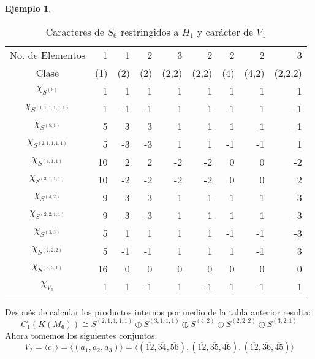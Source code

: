 \documentclass[12pt]{book}
\theoremstyle{definition}
\newtheorem{example}[theorem]{Ejemplo}
\newcounter{in}
\begin{document}
\begin{example}
  \begin{table}[!hbtp]
    \centering
    \begin{tabular}{c |r r r r r r r r}
      No. de Elementos  & 1 & 1 & 2 & 3 & 2 & 2 & 2 & 3  \\
      Clase&(1)& (2) & (2) & (2,2) & (2,2)& (4) & (4,2) & (2,2,2)\\
      \hline
      $\chi_{S^{{(6)}}}$         & 1 & 1 &1  & 1 & 1 & 1 & 1 & 1\\
      $\chi_{S^{{(1,1,1,1,1,1)}}}$ & 1 & -1&-1 & 1 & 1 &-1 & 1 &-1\\
      $\chi_{S^{{(5,1)}}}$       & 5 & 3 & 3 & 1 & 1 & 1 &-1 &-1\\
      $\chi_{S^{{(2,1,1,1,1)}}}$  & 5 & -3& -3 & 1 &1 &-1 &-1 & 1\\
      $\chi_{S^{{(4,1,1)}}}$     & 10& 2  & 2 &-2 &-2& 0 & 0 & -2\\
      $\chi_{S^{{(3,1,1,1)}}}$    & 10&-2 & -2&-2 & -2& 0 & 0 &2\\
      $\chi_{S^{{(4,2)}}}$       & 9 & 3 & 3 & 1 & 1 & -1& 1 & 3\\
      $\chi_{S^{{(2,2,1,1)}}}$    & 9 &-3 & -3&1  & 1 & 1 & 1 & -3\\
      $\chi_{S^{{(3,3)}}}$       & 5 & 1 & 1 &1  &1  & -1& -1& -3\\
      $\chi_{S^{{(2,2,2)}}}$     & 5 &-1 & -1&1  & 1 & 1 &-1& 3\\
      $\chi_{S^{{(3,2,1)}}}$     & 16 &0 &0  & 0 & 0 & 0 & 0& 0\\
      \hline
      $\chi_{V_{1}}$        & 1 & 1 & -1 & 1 & -1 & -1 &-1 & 1  \\
    \end{tabular}
    
    \caption{Caracteres de $S_{6}$ restringidos a $H_{1}$ y carácter de $V_{1}$}
    \label{tab:clanes-H_1-6}
  \end{table}
  Después de calcular los productos internos por medio de la tabla
  anterior resulta:
  \begin{equation}
    C_{1}(K(M_{6}))\cong S^{(2,1,1,1,1)}\oplus S^{(3,1,1,1)}\oplus
    S^{(4,2)} \oplus S^{(2,2,2)}\oplus S^{(3,2,1)}
    \label{C1-KM6}
  \end{equation}
  Ahora tomemos los siguientes conjuntos:
  $$V_{2}=\langle c_{1}\rangle=\langle
  (a_{1},a_{2},a_{3})\rangle=\langle(\overline{12},\overline{34},\overline{56}),(\overline{12},\overline{35},\overline{46}),(\overline{12},\overline{36},\overline{45})\rangle$$


\end{example}
\end{document}

